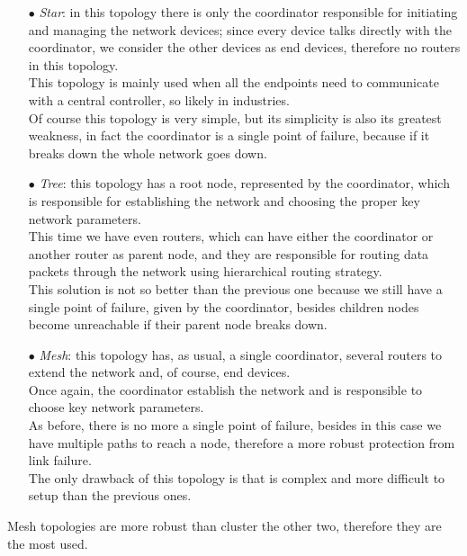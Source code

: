 \documentclass[12pt]{report}
\begin{document}
{\begin{itemize}
\setlength{\itemindent}{+4mm}
\item[$\bullet$] \emph{Star}: in this topology there is only the coordinator responsible for initiating and managing the network devices; since every device talks directly with the coordinator, we consider the other devices as end devices, therefore no routers in this topology.\\
This topology is mainly used when all the endpoints need to communicate with a central controller, so likely in industries.\\
Of course this topology is very simple, but its simplicity is also its greatest weakness, in fact the coordinator is a single point of failure, because if it breaks down the whole network goes down.

\item[$\bullet$] \emph{Tree}: this topology has a root node, represented by the coordinator, which is responsible for establishing the network and choosing the proper key network parameters.\\
This time we have even routers, which can have either the coordinator or another router as parent node, and they are responsible for routing data packets through the network using hierarchical routing strategy.\\
This solution is not so better than the previous one because we still have a single point of failure, given by the coordinator, besides children nodes become unreachable if their parent node breaks down.

\item[$\bullet$] \emph{Mesh}: this topology has, as usual, a single coordinator, several routers to extend the network and, of course, end devices.\\
Once again, the coordinator establish the network and is responsible to choose key network parameters.\\
As before, there is no more a single point of failure, besides in this case we have multiple paths to reach a node, therefore a more robust protection from link failure.\\
The only drawback of this topology is that is complex and more difficult to setup than the previous ones.\\
\end{itemize}

Mesh topologies are more robust than cluster the other two, therefore they are the most used.\\

}
\end{document}
